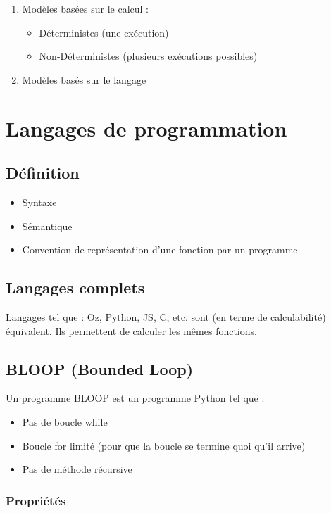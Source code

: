 \begin{enumerate}
\item Modèles basées sur le calcul :
	\begin{itemize}
	\item Déterministes (une exécution)
	\item Non-Déterministes (plusieurs exécutions possibles)
	\end{itemize}
\item Modèles basés sur le langage
\end{enumerate}

\section{Langages de programmation}

\subsection{Définition}

\begin{itemize}
\item Syntaxe
\item Sémantique
\item Convention de représentation d'une fonction par un programme
\end{itemize}

\subsection{Langages complets}

Langages tel que : Oz, Python, JS, C, etc. sont (en terme de calculabilité) équivalent. Ils permettent de calculer les mêmes fonctions.

\subsection{BLOOP (Bounded Loop)}

Un programme BLOOP est un programme Python tel que :
\begin{itemize}
\item Pas de boucle while
\item Boucle for limité (pour que la boucle se termine quoi qu'il arrive)
\item Pas de méthode récursive
\end{itemize}

\subsubsection{Propriétés}

